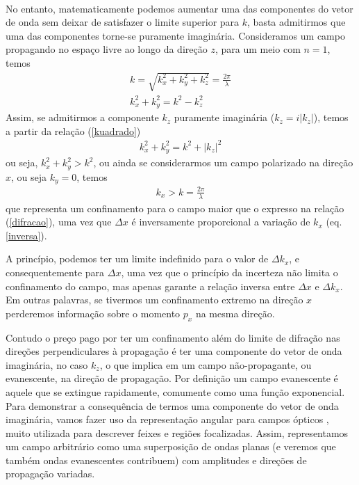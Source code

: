 \paragraph{}
No entanto, matematicamente podemos aumentar uma das componentes do vetor de onda sem deixar de satisfazer o limite superior para $k$, basta admitirmos que uma das componentes torne-se puramente imaginária. Consideramos um campo propagando no espaço livre ao longo da direção $z$, para um meio com $n=1$, temos
\begin{eqnarray}
k=\sqrt{k_x^2+k_y^2+k_z^2}=\frac{2\pi}{\lambda} \nonumber \\
k_x^2+k_y^2=k^2-k_z^2
\label{kuadrado}
\end{eqnarray}
Assim, se admitirmos a componente $k_z$ puramente imaginária ($k_z=i|k_z| $), temos a partir da relação (\ref{kuadrado})
\begin{eqnarray}
k_x^2+k_y^2=k^2+|k_z|^2
\label{maiorquek}
\end{eqnarray}
ou seja, $k_x^2+k_y^2>k^2$, ou ainda se considerarmos um campo polarizado na direção $x$, ou seja $k_y=0$, temos 	
\begin{eqnarray}
k_x>k=\frac{2\pi}{\lambda}
\label{kxmaiorquek}
\end{eqnarray}
que representa um confinamento para o campo maior que o expresso na relação (\ref{difracao}), uma vez que $\Delta x$ é inversamente proporcional a variação de $k_x$ (eq. \ref{inversa}). 

A princípio, podemos ter um limite indefinido para o valor de $\Delta k_x$, e consequentemente para $\Delta x$, uma vez que o princípio da incerteza não limita o confinamento do campo, mas apenas garante a relação inversa entre $\Delta x$ e $\Delta k_x$. Em outras palavras, se tivermos um confinamento extremo na direção $x$ perderemos informação sobre o momento $p_x$  na mesma direção. 

Contudo o preço pago por ter um confinamento além do limite de difração nas direções perpendiculares à propagação é ter uma componente do vetor de onda imaginária, no caso $k_z$, o que implica em um campo não-propagante, ou evanescente, na direção de propagação. Por definição um campo evanescente é aquele que se extingue rapidamente, comumente como uma função exponencial. Para demonstrar a consequência de termos uma componente do vetor de onda imaginária, vamos fazer uso da representação angular para campos ópticos \cite{principle,yoshie}, muito utilizada para descrever feixes e regiões focalizadas. Assim, representamos um campo arbitrário como uma superposição de ondas planas (e veremos que também ondas evanescentes contribuem) com amplitudes e direções de propagação variadas.

